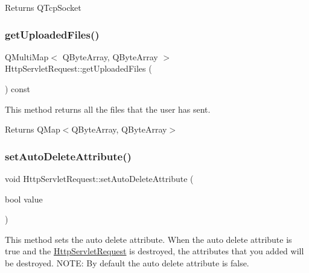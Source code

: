 \begin{DoxyReturn}{Returns}
Q\+Tcp\+Socket 
\end{DoxyReturn}
\mbox{\label{class_http_servlet_request_a8ea2cfef7079b3071f64a369f679b972}} 
\subsubsection{\texorpdfstring{get\+Uploaded\+Files()}{getUploadedFiles()}}
{\footnotesize\ttfamily Q\+Multi\+Map$<$ Q\+Byte\+Array, Q\+Byte\+Array $>$ Http\+Servlet\+Request\+::get\+Uploaded\+Files (\begin{DoxyParamCaption}{ }\end{DoxyParamCaption}) const}



This method returns all the files that the user has sent. 

\begin{DoxyReturn}{Returns}
Q\+Map$<$\+Q\+Byte\+Array, Q\+Byte\+Array$>$ 
\end{DoxyReturn}
\mbox{\label{class_http_servlet_request_a4e58953a673eb24cd67120ecc7f61e93}} 
\subsubsection{\texorpdfstring{set\+Auto\+Delete\+Attribute()}{setAutoDeleteAttribute()}}
{\footnotesize\ttfamily void Http\+Servlet\+Request\+::set\+Auto\+Delete\+Attribute (\begin{DoxyParamCaption}\item[{bool}]{value }\end{DoxyParamCaption})}



This method sets the auto delete attribute. When the auto delete attribute is true and the \hyperlink{class_http_servlet_request}{Http\+Servlet\+Request} is destroyed, the attributes that you added will be destroyed. N\+O\+TE\+: By default the auto delete attribute is false. 


